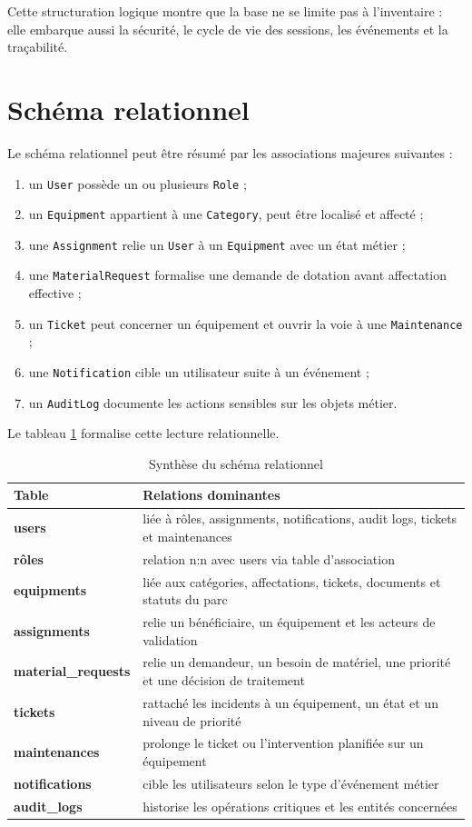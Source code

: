 ﻿\documentclass[12pt,a4paper,oneside]{report}
\begin{document}
Cette structuration logique montre que la base ne se limite pas à l'inventaire : elle embarque aussi la sécurité, le cycle de vie des sessions, les événements et la traçabilité.

\section{Schéma relationnel}
Le schéma relationnel peut être résumé par les associations majeures suivantes :
\begin{enumerate}
  \item un \texttt{User} possède un ou plusieurs \texttt{Role} ;
  \item un \texttt{Equipment} appartient à une \texttt{Category}, peut être localisé et affecté ;
  \item une \texttt{Assignment} relie un \texttt{User} à un \texttt{Equipment} avec un état métier ;
  \item une \texttt{MaterialRequest} formalise une demande de dotation avant affectation effective ;
  \item un \texttt{Ticket} peut concerner un équipement et ouvrir la voie à une \texttt{Maintenance} ;
  \item une \texttt{Notification} cible un utilisateur suite à un événement ;
  \item un \texttt{AuditLog} documente les actions sensibles sur les objets métier.
\end{enumerate}

Le tableau \ref{tab:schema-relationnel} formalise cette lecture relationnelle.

\begin{table}[H]
\centering
\caption{Synthèse du schéma relationnel}
\label{tab:schema-relationnel}
\begin{tabularx}{\textwidth}{>{\bfseries}p{3cm}X}
\toprule
Table & Relations dominantes \\
\midrule
users & liée à rôles, assignments, notifications, audit logs, tickets et maintenances \\
rôles & relation n:n avec users via table d'association \\
equipments & liée aux catégories, affectations, tickets, documents et statuts du parc \\
assignments & relie un bénéficiaire, un équipement et les acteurs de validation \\
material\_requests & relie un demandeur, un besoin de matériel, une priorité et une décision de traitement \\
tickets & rattaché les incidents à un équipement, un état et un niveau de priorité \\
maintenances & prolonge le ticket ou l'intervention planifiée sur un équipement \\
notifications & cible les utilisateurs selon le type d'événement métier \\
audit\_logs & historise les opérations critiques et les entités concernées \\
\bottomrule
\end{tabularx}
\end{table}
\end{document}
